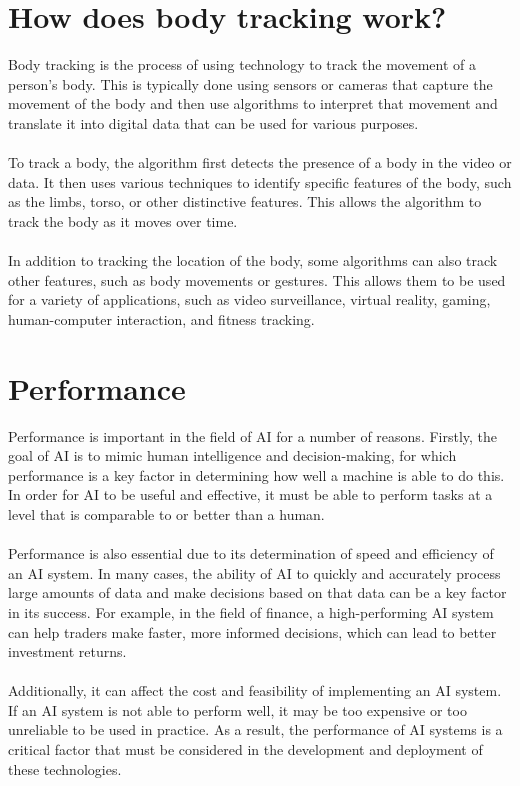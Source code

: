 
\section{How does body tracking work?}
Body tracking is the process of using technology to track the movement of a person's body. This is typically done using sensors or cameras that capture the movement of the body and then use algorithms to interpret that movement and translate it into digital data that can be used for various purposes. 
\\
\\
To track a body, the algorithm first detects the presence of a body in the video or data. It then uses various techniques to identify specific features of the body, such as the limbs, torso, or other distinctive features. This allows the algorithm to track the body as it moves over time. 
\\
\\
In addition to tracking the location of the body, some algorithms can also track other features, such as body movements or gestures. This allows them to be used for a variety of applications, such as video surveillance, virtual reality, gaming, human-computer interaction, and fitness tracking.

\section{Performance}
Performance is important in the field of AI for a number of reasons. Firstly, the goal of AI is to mimic human intelligence and decision-making, for which performance is a key factor in determining how well a machine is able to do this. In order for AI to be useful and effective, it must be able to perform tasks at a level that is comparable to or better than a human.
\\
\\
Performance is also essential due to its determination of speed and efficiency of an AI system. In many cases, the ability of AI to quickly and accurately process large amounts of data and make decisions based on that data can be a key factor in its success. For example, in the field of finance, a high-performing AI system can help traders make faster, more informed decisions, which can lead to better investment returns.
\\
\\
Additionally, it can affect the cost and feasibility of implementing an AI system. If an AI system is not able to perform well, it may be too expensive or too unreliable to be used in practice. As a result, the performance of AI systems is a critical factor that must be considered in the development and deployment of these technologies.
